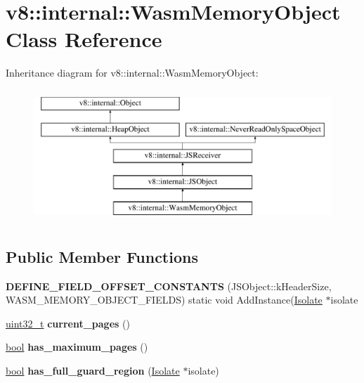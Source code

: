 \hypertarget{classv8_1_1internal_1_1WasmMemoryObject}{}\section{v8\+:\+:internal\+:\+:Wasm\+Memory\+Object Class Reference}
\label{classv8_1_1internal_1_1WasmMemoryObject}
Inheritance diagram for v8\+:\+:internal\+:\+:Wasm\+Memory\+Object\+:\begin{figure}[H]
\begin{center}
\leavevmode
\includegraphics[height=5.000000cm]{classv8_1_1internal_1_1WasmMemoryObject}
\end{center}
\end{figure}
\subsection*{Public Member Functions}
\begin{DoxyCompactItemize}
\item 
\mbox{\label{classv8_1_1internal_1_1WasmMemoryObject_a7533a3f2e00617100e79a01ddd5d466d}} 
{\bfseries D\+E\+F\+I\+N\+E\+\_\+\+F\+I\+E\+L\+D\+\_\+\+O\+F\+F\+S\+E\+T\+\_\+\+C\+O\+N\+S\+T\+A\+N\+TS} (J\+S\+Object\+::k\+Header\+Size, W\+A\+S\+M\+\_\+\+M\+E\+M\+O\+R\+Y\+\_\+\+O\+B\+J\+E\+C\+T\+\_\+\+F\+I\+E\+L\+DS) static void Add\+Instance(\mbox{\hyperlink{classv8_1_1internal_1_1Isolate}{Isolate}} $\ast$isolate
\item 
\mbox{\label{classv8_1_1internal_1_1WasmMemoryObject_ac92f7d035daa100186051ee1707d2e7f}} 
\mbox{\hyperlink{classuint32__t}{uint32\+\_\+t}} {\bfseries current\+\_\+pages} ()
\item 
\mbox{\label{classv8_1_1internal_1_1WasmMemoryObject_a7ce26bf7f45ae37057ae2017749b25bf}} 
\mbox{\hyperlink{classbool}{bool}} {\bfseries has\+\_\+maximum\+\_\+pages} ()
\item 
\mbox{\label{classv8_1_1internal_1_1WasmMemoryObject_af0f2120b6c6bab8388b9d92f736f221d}} 
\mbox{\hyperlink{classbool}{bool}} {\bfseries has\+\_\+full\+\_\+guard\+\_\+region} (\mbox{\hyperlink{classv8_1_1internal_1_1Isolate}{Isolate}} $\ast$isolate)
\end{DoxyCompactItemize}
